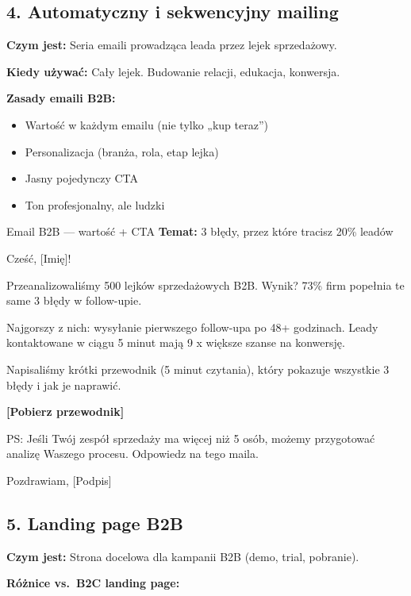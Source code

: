 \documentclass[
  12pt,
  a4paper,
  twoside,
  openright,
  12pt,
  DIV=12,
  BCOR=12mm]{scrbook}
\providecommand{\tightlist}{%
  \setlength{\itemsep}{0pt}\setlength{\parskip}{0pt}}\usepackage{longtable,booktabs,array}
\begin{document}
\subsection{4. Automatyczny i sekwencyjny
mailing}\label{automatyczny-i-sekwencyjny-mailing}

\textbf{Czym jest:} Seria emaili prowadząca leada przez lejek
sprzedażowy.

\textbf{Kiedy używać:} Cały lejek. Budowanie relacji, edukacja,
konwersja.

\textbf{Zasady emaili B2B:}

\begin{itemize}
\tightlist
\item
  Wartość w każdym emailu (nie tylko „kup teraz'')
\item
  Personalizacja (branża, rola, etap lejka)
\item
  Jasny pojedynczy CTA
\item
  Ton profesjonalny, ale ludzki
\end{itemize}

\begin{przyklad}{Email B2B --- wartość + CTA}
\textbf{Temat:} 3 błędy, przez które tracisz 20\% leadów

Cześć, [Imię]!

Przeanalizowaliśmy 500 lejków sprzedażowych B2B. Wynik? 73\% firm popełnia te same 3 błędy w follow-upie.

Najgorszy z nich: wysyłanie pierwszego follow-upa po 48+ godzinach. Leady kontaktowane w ciągu 5 minut mają 9 x większe szanse na konwersję.

Napisaliśmy krótki przewodnik (5 minut czytania), który pokazuje wszystkie 3 błędy i jak je naprawić.

\textbf{[Pobierz przewodnik]}

PS: Jeśli Twój zespół sprzedaży ma więcej niż 5 osób, możemy przygotować analizę Waszego procesu. Odpowiedz na tego maila.

Pozdrawiam,
[Podpis]
\end{przyklad}

\subsection{5. Landing page B2B}\label{landing-page-b2b}

\textbf{Czym jest:} Strona docelowa dla kampanii B2B (demo, trial,
pobranie).

\textbf{Różnice vs.~B2C landing page:}
\end{document}
